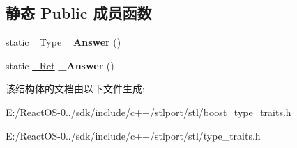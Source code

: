 \subsection*{静态 Public 成员函数}
\begin{DoxyCompactItemize}
\item 
\mbox{\label{struct___trivial_copy_a5f1c783fb8fa2fd92f4ae168fab09ccb}} 
static \hyperlink{struct____false__type}{\+\_\+\+Type} {\bfseries \+\_\+\+Answer} ()
\item 
\mbox{\label{struct___trivial_copy_a58648a7d6888991fac08f41f2cc4f37e}} 
static \hyperlink{struct____true__type}{\+\_\+\+Ret} {\bfseries \+\_\+\+Answer} ()
\end{DoxyCompactItemize}


该结构体的文档由以下文件生成\+:\begin{DoxyCompactItemize}
\item 
E\+:/\+React\+O\+S-\/0../sdk/include/c++/stlport/stl/boost\+\_\+type\+\_\+traits.\+h\item 
E\+:/\+React\+O\+S-\/0../sdk/include/c++/stlport/stl/type\+\_\+traits.\+h\end{DoxyCompactItemize}
